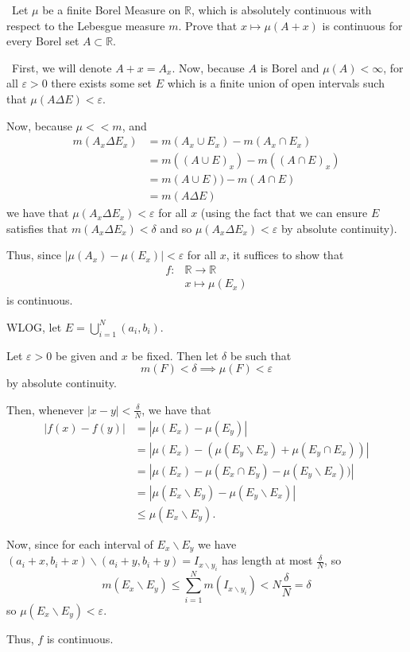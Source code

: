 \documentclass[12pt]{Qual}
\begin{document}
\begin{problem} $\,$
Let $\mu$ be a finite Borel Measure on $\mathbb{R}$, which is absolutely continuous with respect to the Lebesgue measure $m$. Prove that $x\mapsto\mu(A+x)$ is continuous for every Borel set $A\subset\mathbb{R}$.
\end{problem}


\begin{solution}$\,$
First, we will denote $A+x=A_x$. Now, because $A$ is Borel and $\mu(A)<\infty$, for all $\varepsilon>0$ there exists some set $E$ which is a finite union of open intervals such that $\mu(A\Delta E)<\varepsilon$.

Now, because $\mu<<m$, and \begin{align*}
    m(A_x\Delta E_x)&=m(A_x\cup E_x)-m(A_x\cap E_x)\\
    &=m((A\cup E)_x)-m((A\cap E)_x)\\
    &=m(A\cup E))-m(A\cap E)\\
    &=m(A\Delta E)
\end{align*}
we have that $\mu(A_x\Delta E_x)<\varepsilon$ for all $x$ (using the fact that we can ensure $E$ satisfies that $m(A_x\Delta E_x)<\delta$ and so $\mu(A_x\Delta E_x)<\varepsilon$ by absolute continuity).

Thus, since $|\mu(A_x)-\mu(E_x)|<\varepsilon$ for all $x$, it suffices to show that \begin{align*}
    f:&\mathbb{R}\to\mathbb{R}\\
    &x\mapsto \mu(E_x)
\end{align*} is continuous.

WLOG, let $E=\bigcup_{i=1}^N(a_i,b_i)$.

Let $\varepsilon>0$ be given and $x$ be fixed. Then let $\delta$ be such that $$m(F)<\delta\implies \mu(F)<\varepsilon$$ by absolute continuity.

Then, whenever $|x-y|<\frac{\delta}{N}$, we have that \begin{align*}
    |f(x)-f(y)|&=|\mu(E_x)-\mu(E_y)|\\
    &=|\mu(E_x)-(\mu(E_y\backslash E_x)+\mu(E_y\cap E_x))|\\
    &=|\mu(E_x)-\mu(E_x\cap E_y)-\mu(E_y\backslash E_x))|\\
    &=|\mu(E_x\backslash E_y)-\mu(E_y\backslash E_x)|\\
    &\le \mu(E_x\backslash E_y).
\end{align*}

Now, since for each interval of $E_x\backslash E_y$ we have $(a_i+x,b_i+x)\backslash (a_i+y,b_i+y)=I_{{x\backslash y}_i}$ has length at most $\frac{\delta}{N}$, so $$m(E_x\backslash E_y)\le\sum_{i=1}^Nm(I_{{x\backslash y}_i})<N\frac{\delta}{N}=\delta$$ so $\mu(E_x\backslash E_y)<\varepsilon$.

Thus, $f$ is continuous.
\end{solution}
\newpage
\end{document}
